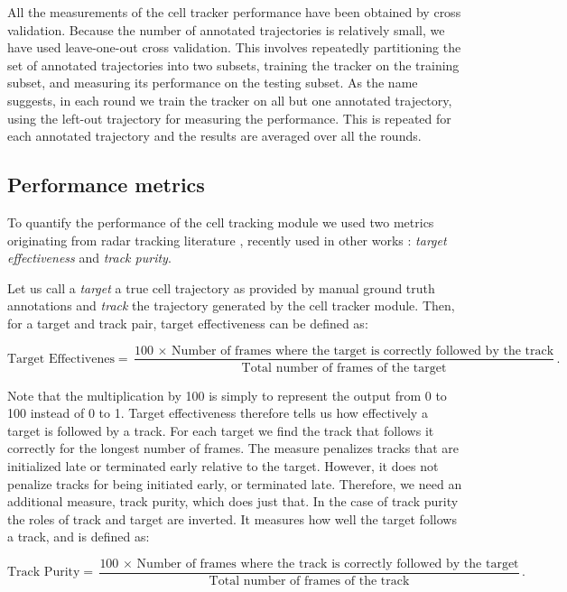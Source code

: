 	All the measurements of the cell tracker performance have been obtained by cross validation. Because the number of annotated trajectories is relatively small, we have used leave-one-out cross validation. This involves repeatedly partitioning the set of annotated trajectories into two subsets, training the tracker on the training subset, and measuring its performance on the testing subset. As the name suggests, in each round we train the tracker on all but one annotated trajectory, using the left-out trajectory for measuring the performance. This is repeated for each annotated trajectory and the results are averaged over all the rounds.

	\subsection{Performance metrics}
	
	To quantify the performance of the cell tracking module we used two metrics originating from radar tracking literature \cite{blackman99}, recently used in other works \cite{bise11global, huh13, eom07}: \textit{target effectiveness} and \textit{track purity}.
	
	Let us call a \textit{target} a true cell trajectory as provided by manual ground truth annotations and \textit{track} the trajectory generated by the cell tracker module. Then, for a target and track pair, target effectiveness can be defined as:
	
	\[
		\text{Target Effectivenes} = \frac{\text{100 $\times$ Number of frames where the target is correctly followed by the track}}{\text{Total number of frames of the target}}\text{.}
	\]
	
	Note that the multiplication by 100 is simply to represent the output from 0 to 100 instead of 0 to 1. 	Target effectiveness therefore tells us how effectively a target is followed by a track. For each target we find the track that follows it correctly for the longest number of frames. The measure penalizes tracks that are initialized late or terminated early relative to the target. However, it does not penalize tracks for being initiated early, or terminated late. Therefore, we need an additional measure, track purity, which does just that. In the case of track purity the roles of track and target are inverted. It measures how well the target follows a track, and is defined as:
	
	\[
		\text{Track Purity} = \frac{\text{100 $\times$ Number of frames where the track is correctly followed by the target}}{\text{Total number of frames of the track}}\text{.}
	\]
	
